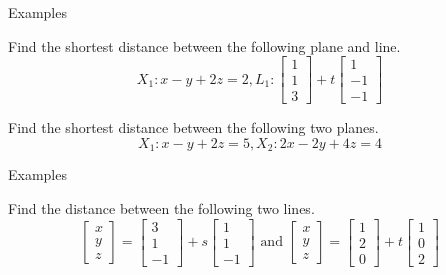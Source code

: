 \documentclass{beamer}
\begin{document}
\begin{frame}{Examples}
\begin{example}
Find the shortest distance between the following plane and line.
\begin{equation*}
X_1:x-y+2z=2, L_1:\left[
\begin{array}{c}
1\\
1\\
3
\end{array}
\right]+t \left[
\begin{array}{c}
1\\
-1\\
-1
\end{array}
\right]
\end{equation*}
\end{example}
\begin{example}
Find the shortest distance between the following two planes.
\begin{equation*}
X_1:x-y+2z=5, X_2:2x-2y+4z=4
\end{equation*}
\end{example}
\end{frame}

\begin{frame}{Examples}
\begin{example}
Find the distance between the following two lines.
\begin{equation*}
\left[
\begin{array}{c}
x\\
y\\
z
\end{array}
\right] = \left[
\begin{array}{c}
3\\
1\\
-1
\end{array}
\right]+s \left[
\begin{array}{c}
1\\
1\\
-1
\end{array}
\right]\text{ and } \left[
\begin{array}{c}
x\\
y\\
z
\end{array}
\right] = \left[
\begin{array}{c}
1\\
2\\
0
\end{array}
\right] +t \left[
\begin{array}{c}
1\\
0\\
2
\end{array}
\right]
\end{equation*}
\end{example}
\end{frame}
\end{document}
